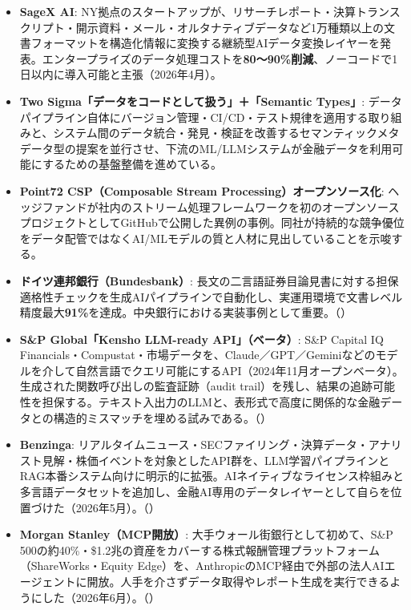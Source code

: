 \begin{itemize}
  \item \textbf{SageX AI}: NY拠点のスタートアップが、リサーチレポート・決算トランスクリプト・開示資料・メール・オルタナティブデータなど1万種類以上の文書フォーマットを構造化情報に変換する継続型AIデータ変換レイヤーを発表。エンタープライズのデータ処理コストを\textbf{80〜90\%削減}、ノーコードで1日以内に導入可能と主張（2026年4月）。
  \item \textbf{Two Sigma「データをコードとして扱う」＋「Semantic Types」}: データパイプライン自体にバージョン管理・CI/CD・テスト規律を適用する取り組みと、システム間のデータ統合・発見・検証を改善するセマンティックメタデータ型の提案を並行させ、下流のML/LLMシステムが金融データを利用可能にするための基盤整備を進めている。
  \item \textbf{Point72 CSP（Composable Stream Processing）オープンソース化}: ヘッジファンドが社内のストリーム処理フレームワークを初のオープンソースプロジェクトとしてGitHubで公開した異例の事例。同社が持続的な競争優位をデータ配管ではなくAI/MLモデルの質と人材に見出していることを示唆する。
  \item \textbf{ドイツ連邦銀行（Bundesbank）}: 長文の二言語証券目論見書に対する担保適格性チェックを生成AIパイプラインで自動化し、実運用環境で文書レベル精度最大\textbf{91\%}を達成。中央銀行における実装事例として重要。（\cite{llmeligibilitycriteria2026}）
  \item \textbf{S\&P Global「Kensho LLM-ready API」（ベータ）}: S\&P Capital IQ Financials・Compustat・市場データを、Claude／GPT／Geminiなどのモデルを介して自然言語でクエリ可能にするAPI（2024年11月オープンベータ）。生成された関数呼び出しの監査証跡（audit trail）を残し、結果の追跡可能性を担保する。テキスト入出力のLLMと、表形式で高度に関係的な金融データとの構造的ミスマッチを埋める試みである。（\cite{kenshoapi2024}）
  \item \textbf{Benzinga}: リアルタイムニュース・SECファイリング・決算データ・アナリスト見解・株価イベントを対象としたAPI群を、LLM学習パイプラインとRAG本番システム向けに明示的に拡張。AIネイティブなライセンス枠組みと多言語データセットを追加し、金融AI専用のデータレイヤーとして自らを位置づけた（2026年5月）。（\cite{benzingaai2026}）
  \item \textbf{Morgan Stanley（MCP開放）}: 大手ウォール街銀行として初めて、S\&P 500の約40\%・\$1.2兆の資産をカバーする株式報酬管理プラットフォーム（ShareWorks・Equity Edge）を、AnthropicのMCP経由で外部の法人AIエージェントに開放。人手を介さずデータ取得やレポート生成を実行できるようにした（2026年6月）。（\cite{morganstanleymcp2026}）

\end{itemize}
